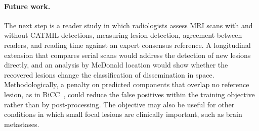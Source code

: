 \paragraph{Future work.}
The next step is a reader study in which radiologists assess MRI scans with
and without CATMIL detections, measuring lesion detection, agreement
between readers, and reading time against an expert consensus reference.
A longitudinal extension that compares serial scans would address the
detection of new lesions directly, and an analysis by McDonald location
would show whether the recovered lesions change the classification of
dissemination in space. Methodologically, a penalty on predicted
components that overlap no reference lesion, as in
BiCC~\cite{bouteille_bicc_2026}, could reduce the false positives within
the training objective rather than by post-processing. The objective may
also be useful for other conditions in which small focal lesions are
clinically important, such as brain metastases.
